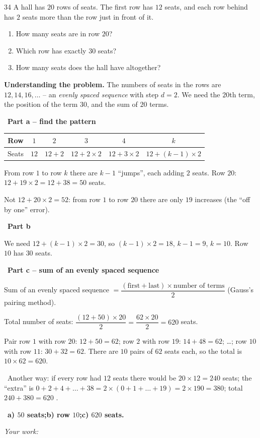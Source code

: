 \documentclass[11pt]{article}
\newif\ifsol \solfalse
\providecommand{\AnsWord}{Đáp số}
\newenvironment{probbox}[2]{\begin{probboxT}{#1}{#2}}{\end{probboxT}}
\newcommand{\StuProb}[2]{\begin{probboxS}{#1}{#2}\StuProbBody\end{probboxS}}
\newcommand{\ans}[1]{\par\smallskip{\bfseries\color{tmGreen!88!black}\AnsWord:}\ {\bfseries\color{AnsRed}#1}\par}
\newcommand{\probsol}[1]{%
  \begin{lrbox}{\solmeasure}\begin{minipage}{\dimexpr\linewidth-24pt\relax}#1\end{minipage}\end{lrbox}%
  \ifsol
    \begin{solbox}#1\end{solbox}%
  \else
    \setlength{\solht}{\dimexpr\ht\solmeasure+\dp\solmeasure+0.85cm\relax}%
    \ifdim\solht<1.35cm\setlength{\solht}{1.35cm}\fi
    \ifdim\solht>\StudentMaxWork\setlength{\solht}{\StudentMaxWork}\fi
    \par\noindent\begin{minipage}{\linewidth}%
    \expandafter\StuProb\StuProbArgs
    \begin{tcolorbox}[colback=white,colframe=Line,boxrule=0.8pt,arc=5pt,
      left=8pt,right=8pt,top=4pt,bottom=4pt,height=\solht]{\footnotesize\color{Slate}\itshape\WorkWord}\end{tcolorbox}%
    \end{minipage}\par\medskip
  \fi}
\newlength{\StudentMaxWork}\setlength{\StudentMaxWork}{4.5cm}
\newcommand{\step}[2]{\par\smallskip\noindent{\bfseries\color{tmBlue!85!black}\StepWord~#1.}\ {\bfseries #2}\par\nopagebreak}
\newcommand{\verify}[1]{\par\smallskip\noindent{\bfseries\color{tmGreen!80!black}\faCheckCircle\ \CheckWord}\ #1\par}
\def\WorkWord{Your work:}
\def\AnsWord{Answer}
\def\StepWord{Step}
\def\CheckWord{Check:}
\begin{document}
\begin{probbox}{34}{\relax}
A hall has $20$ rows of seats. The first row has $12$ seats, and each row behind has $2$ seats more than the row just in front of it.
\begin{enumerate}[label=\alph*),leftmargin=1.5em,itemsep=0pt,topsep=2pt]
\item How many seats are in row $20$?
\item Which row has exactly $30$ seats?
\item How many seats does the hall have altogether?
\end{enumerate}
\end{probbox}
\probsol{
\textbf{Understanding the problem.} The numbers of seats in the rows are $12,14,16,\dots$ -- an \emph{evenly spaced sequence} with step $d=2$. We need the $20$th term, the position of the term $30$, and the sum of $20$ terms.
\step{1}{Part a -- find the pattern}
\begin{center}
\begin{tabular}{|c|c|c|c|c|c|}\hline
Row & $1$ & $2$ & $3$ & $4$ & $k$\\ \hline
Seats & $12$ & $12+2$ & $12+2\times2$ & $12+3\times2$ & $12+(k-1)\times2$\\ \hline
\end{tabular}
\end{center}
From row $1$ to row $k$ there are $k-1$ ``jumps'', each adding $2$ seats. Row $20$: $12+19\times2=12+38=50$ seats.
\begin{warnbox}Not $12+20\times2=52$: from row $1$ to row $20$ there are only $19$ increases (the ``off by one'' error).\end{warnbox}
\step{2}{Part b}
We need $12+(k-1)\times2=30$, so $(k-1)\times2=18$, $k-1=9$, $k=10$. Row $10$ has $30$ seats.
\step{3}{Part c -- sum of an evenly spaced sequence}
\begin{recallbox}Sum of an evenly spaced sequence $=\dfrac{(\text{first}+\text{last})\times\text{number of terms}}{2}$ (Gauss's pairing method).\end{recallbox}
Total number of seats: $\dfrac{(12+50)\times20}{2}=\dfrac{62\times20}{2}=620$ seats.
\begin{proofbox}Pair row $1$ with row $20$: $12+50=62$; row $2$ with row $19$: $14+48=62$; \ldots; row $10$ with row $11$: $30+32=62$. There are $10$ pairs of $62$ seats each, so the total is $10\times62=620$.\end{proofbox}
\verify{Another way: if every row had $12$ seats there would be $20\times12=240$ seats; the ``extra'' is $0+2+4+\dots+38=2\times(0+1+\dots+19)=2\times190=380$; total $240+380=620$ \checkmark.}
\ans{a) $50$ seats;\quad b) row $10$;\quad c) $620$ seats.}
}
\end{document}
